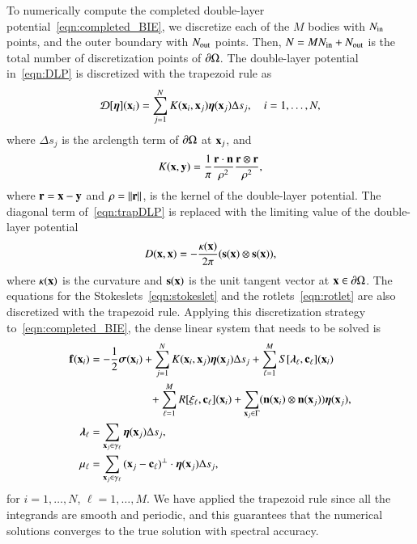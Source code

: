 \documentclass[preprint, 10pt]{elsarticle}
\begin{document}
To numerically compute the completed double-layer
potential~\eqref{eqn:completed_BIE}, we discretize each of the $M$
bodies with  $N_{\mathrm{in}}$ points, and the outer boundary with $N_{\mathrm{out}}$
points.  Then, $N = MN_{\mathrm{in}} + N_{\mathrm{out}}$ is the total number of
discretization points of ${\partial}\Omega$.  The double-layer potential
in~\eqref{eqn:DLP} is discretized with the trapezoid rule as
\begin{align}
  {\mathcal{D}}[{\boldsymbol\eta}]({\mathbf{x}}_i) = \sum_{j=1}^{N} K({\mathbf{x}}_i,{\mathbf{x}}_j) {\boldsymbol\eta}({\mathbf{x}}_j) 
      \Delta s_{j}, \quad i=1,\ldots,N,
  \label{eqn:trapDLP}
\end{align}
where $\Delta s_j$ is the arclength term of ${\partial}\Omega$ at
${\mathbf{x}}_j$, and
\begin{align*}
  K({\mathbf{x}},{\mathbf{y}}) = \frac{1}{\pi} \frac{{\mathbf{r}} \cdot {\mathbf{n}}}{\rho^2} 
      \frac{{\mathbf{r}} \otimes {\mathbf{r}}}{\rho^2},
\end{align*}
where ${\mathbf{r}} = {\mathbf{x}} - {\mathbf{y}}$ and $\rho = \|{\mathbf{r}}\|$, is the kernel of the
double-layer potential.  The diagonal term of~\eqref{eqn:trapDLP} is
replaced with the limiting value of the double-layer potential
\begin{align*}
  D({\mathbf{x}},{\mathbf{x}}) = -\frac{\kappa({\mathbf{x}})}{2\pi}({\mathbf{s}}({\mathbf{x}}) \otimes {\mathbf{s}}({\mathbf{x}})),
\end{align*}
where $\kappa({\mathbf{x}})$ is the curvature and ${\mathbf{s}}({\mathbf{x}})$ is the unit tangent
vector at ${\mathbf{x}} \in {\partial}\Omega$.  The equations for the
Stokeslets~\eqref{eqn:stokeslet} and the rotlets~\eqref{eqn:rotlet} are
also discretized with the trapezoid rule.  Applying this discretization
strategy to~\eqref{eqn:completed_BIE}, the dense linear system that
needs to be solved is
\begin{equation}
  \label{eqn:completed_BIE_discretized}
  \begin{aligned}
    {\mathbf{f}}({\mathbf{x}}_i) &= -\frac{1}{2}{\boldsymbol\sigma}({\mathbf{x}}_i) + \sum_{j=1}^{N} 
      K({\mathbf{x}}_i,{\mathbf{x}}_j) {\boldsymbol\eta}({\mathbf{x}}_j) \Delta s_{j} + 
      \sum_{\ell=1}^M S[{\boldsymbol\lambda}_\ell,{\mathbf{c}}_\ell]({\mathbf{x}}_i) \\
      &\hspace{53pt}
      +\sum_{\ell=1}^M R[\xi_\ell,{\mathbf{c}}_\ell]({\mathbf{x}}_i) 
      +\sum_{{\mathbf{x}}_j \in \Gamma} ({\mathbf{n}}({\mathbf{x}}_i) \otimes
      {\mathbf{n}}({\mathbf{x}}_j)){\boldsymbol\eta}({\mathbf{x}}_j), \\
    {\boldsymbol\lambda}_\ell &= \sum_{{\mathbf{x}}_j \in \gamma_\ell} {\boldsymbol\eta}({\mathbf{x}}_j) 
      \Delta s_j, \\ 
    \mu_\ell &= \sum_{{\mathbf{x}}_j \in \gamma_\ell}
      {({\mathbf{x}}_j - {\mathbf{c}}_\ell)}^\perp \cdot {\boldsymbol\eta}({\mathbf{x}}_j) \Delta s_j,
  \end{aligned}
\end{equation}
for $i=1,\ldots,N$, $\ell=1,\ldots,M$.  We have applied the trapezoid
rule since all the integrands are smooth and periodic, and this
guarantees that the numerical solutions converges to the true solution
with spectral accuracy.
\end{document}
